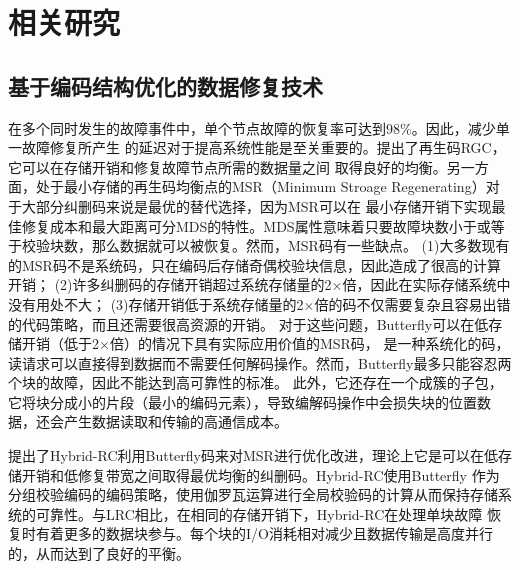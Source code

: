 \chapter{相关研究}



\section{基于编码结构优化的数据修复技术}

在多个同时发生的故障事件中，单个节点故障的恢复率可达到$98\%$\cite{rashmi2014hitchhiker,xia2015tale}。因此，减少单一故障修复所产生
的延迟对于提高系统性能是至关重要的。\citet{dimakis2007benefits,dimakis2010network}提出了再生码RGC，它可以在存储开销和修复故障节点所需的数据量之间
取得良好的均衡。另一方面，处于最小存储的再生码均衡点的MSR（Minimum Stroage Regenerating）对于大部分纠删码来说是最优的替代选择，因为MSR可以在
最小存储开销下实现最佳修复成本和最大距离可分MDS的特性。MDS属性意味着只要故障块数小于或等于校验块数，那么数据就可以被恢复。然而，MSR码有一些缺点。
(1)大多数现有的MSR码不是系统码，只在编码后存储奇偶校验块信息，因此造成了很高的计算开销；
(2)许多纠删码的存储开销超过系统存储量的2×倍，因此在实际存储系统中没有用处不大；
(3)存储开销低于系统存储量的2×倍的码不仅需要复杂且容易出错的代码策略，而且还需要很高资源的开销。
对于这些问题，Butterfly\cite{pamies2016opening}可以在低存储开销（低于2×倍）的情况下具有实际应用价值的MSR码，
是一种系统化的码，读请求可以直接得到数据而不需要任何解码操作。然而，Butterfly最多只能容忍两个块的故障，因此不能达到高可靠性的标准。
此外，它还存在一个成簇的子包，它将块分成小的片段（最小的编码元素），导致编解码操作中会损失块的位置数据，还会产生数据读取和传输的高通信成本。

\citet{ye2017hybrid}提出了Hybrid-RC利用Butterfly码来对MSR进行优化改进，理论上它是可以在低存储开销和低修复带宽之间取得最优均衡的纠删码。Hybrid-RC使用Butterfly
作为分组校验编码的编码策略，使用伽罗瓦运算进行全局校验码的计算从而保持存储系统的可靠性。与LRC相比，在相同的存储开销下，Hybrid-RC在处理单块故障
恢复时有着更多的数据块参与。每个块的I/O消耗相对减少且数据传输是高度并行的，从而达到了良好的平衡。

